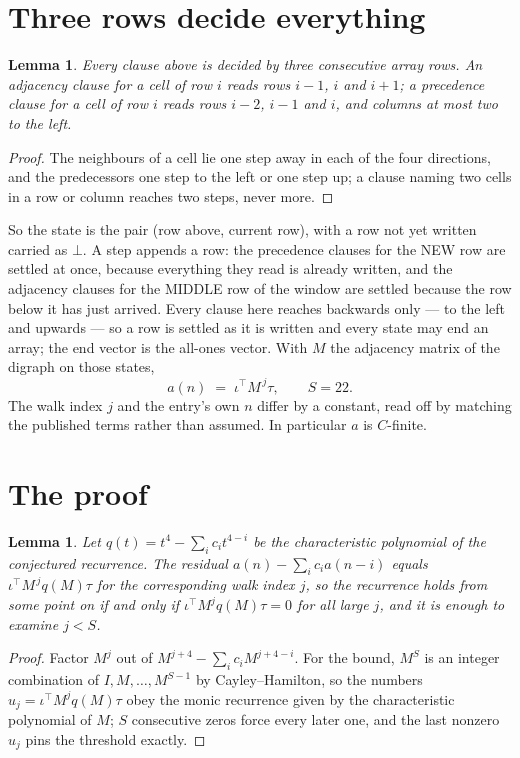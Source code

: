 \documentclass[11pt,a4paper]{article}
\theoremstyle{plain}
\newtheorem{lemma}[theorem]{Lemma}
\theoremstyle{definition}
\begin{document}
\section{Three rows decide everything}

\begin{lemma}\label{lem:win}
Every clause above is decided by three consecutive array rows. An adjacency clause for a cell
of row $i$ reads rows $i-1$, $i$ and $i+1$; a precedence clause for a cell of row $i$ reads
rows $i-2$, $i-1$ and $i$, and columns at most two to the left.
\end{lemma}

\begin{proof}
The neighbours of a cell lie one step away in each of the four directions, and the predecessors
one step to the left or one step up; a clause naming two cells in a row or column reaches two
steps, never more.
\end{proof}

So the state is the pair (row above, current row), with a row not yet written carried as
$\bot$. A step appends a row: the precedence clauses for the NEW row are settled at once,
because everything they read is already written, and the adjacency clauses for the MIDDLE row
of the window are settled because the row below it has just arrived. Every clause here reaches backwards only --- to the left and upwards --- so a
row is settled as it is written and every state may end an array; the end vector is the
all-ones vector. With $M$ the
adjacency matrix of the digraph on those states,
\[
a(n)\;=\;\iota^{\!\top}M^{\,j}\tau ,\qquad S=22.
\]
The walk index $j$ and the entry's own $n$ differ by a constant, read off by matching the
published terms rather than assumed. In particular $a$ is $C$-finite.

\section{The proof}

\begin{lemma}\label{lem:crit}
Let $q(t)=t^{4}-\sum_i c_it^{4-i}$ be the characteristic polynomial of the
conjectured recurrence. The residual $a(n)-\sum_ic_ia(n-i)$ equals
$\iota^{\!\top}M^{\,j}q(M)\tau$ for the corresponding walk index $j$, so the recurrence
holds from some point on if and only if $\iota^{\!\top}M^{j}q(M)\tau=0$ for all large $j$,
and it is enough to examine $j<S$.
\end{lemma}

\begin{proof}
Factor $M^{j}$ out of $M^{j+4}-\sum_ic_iM^{j+4-i}$. For the bound, $M^{S}$
is an integer combination of $I,M,\dots,M^{S-1}$ by Cayley--Hamilton, so the numbers
$u_j=\iota^{\!\top}M^{j}q(M)\tau$ obey the monic recurrence given by the characteristic
polynomial of $M$; $S$ consecutive zeros force every later one, and the last nonzero $u_j$
pins the threshold exactly.
\end{proof}
\end{document}
